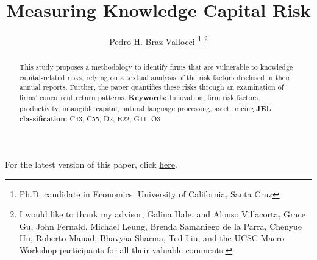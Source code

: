 \documentclass[12pt, letterpaper]{article}
\begin{document}
\title{Measuring Knowledge Capital Risk}
\author{Pedro H. Braz Vallocci \footnote{Ph.D. candidate in Economics, University of California, Santa Cruz} 
\footnote{I would like to thank my advisor, Galina Hale, and Alonso Villacorta, Grace Gu, John Fernald, Michael Leung, Brenda Samaniego de la Parra, Chenyue Hu, Roberto Mauad, Bhavyaa Sharma, Ted Liu, and the UCSC Macro Workshop participants for all their valuable comments.}} %

\newcommand{\ffo}{dicfullmc10thr10defnob5noa0_8_4t}

\newcommand{\insertfigure}[3]{
\begin{figure}[H]
  \centering
  \texttt{[image: \\ffo/\#1]}
  \caption{#2}
  \label{fig:#1}
\end{figure}
}


\newcommand{\tkk}{$Topic_{kk}$ }

\maketitle 

\begin{center}
For the latest version of this paper, click \href{https://github.com/pbrazval/jmdocs/blob/main/brazvallocci_jmp.pdf}{here}.
\end{center}

\begin{abstract}
    This study proposes a methodology to identify firms that are vulnerable to knowledge capital-related risks, relying on a textual analysis of the risk factors disclosed in their annual reports. Further, the paper quantifies these risks through an examination of firms' concurrent return patterns. \newline \textbf{\indent Keywords:} Innovation, firm risk factors, productivity, intangible capital, natural language processing, asset pricing \newline \textbf{\indent JEL classification:} C43, C55, D2, E22, G11, O3
\end{abstract}
\end{document}
